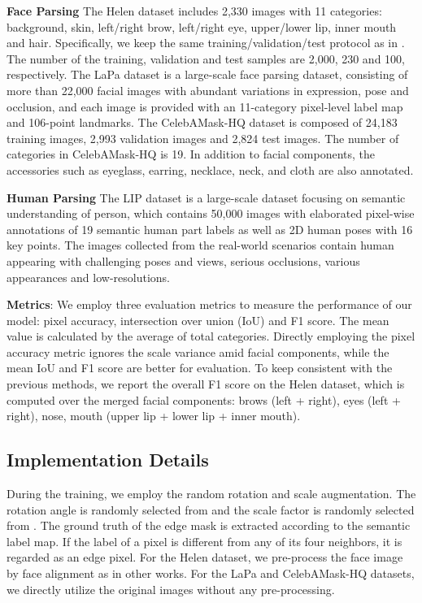 \textbf{Face Parsing} The Helen dataset \cite{le2012interactive} includes 2,330 images with 11 categories: background, skin, left/right brow, left/right eye, upper/lower lip, inner mouth and hair. Specifically, we keep the same training/validation/test protocol as in \cite{le2012interactive}. The number of the training, validation and test samples are 2,000, 230 and 100, respectively. 
The LaPa dataset \cite{liu2020new} is a large-scale face parsing dataset, consisting of more than 22,000 facial images with abundant variations in expression, pose and occlusion, and each image is provided with an 11-category pixel-level label map and 106-point landmarks. 
The CelebAMask-HQ dataset \cite{CelebAMask-HQ} is composed of 24,183 training images, 2,993 validation images and 2,824 test images. The number of categories in CelebAMask-HQ is 19. In addition to facial components, the accessories such as eyeglass, earring, necklace, neck, and cloth are also annotated.

\textbf{Human Parsing} 
The LIP dataset \cite{gong2017look} is a large-scale dataset focusing on semantic understanding of person, which contains 50,000 images with elaborated pixel-wise annotations of 19 semantic human part labels as well as 2D human poses with 16 key points. The images collected from the real-world scenarios contain human appearing with challenging poses and views, serious occlusions, various appearances and low-resolutions.

\textbf{Metrics}: We employ three evaluation metrics to measure the performance of our model: pixel accuracy, intersection over union (IoU) and F1 score. The mean value is calculated by the average of total categories.
Directly employing the pixel accuracy metric ignores the scale variance amid facial components, while the mean IoU and F1 score are better for evaluation. 
To keep consistent with the previous methods, we report the overall F1 score on the Helen dataset, which is computed over the merged facial components: brows (left + right), eyes (left + right), nose, mouth (upper lip + lower lip + inner mouth).

\subsection{Implementation Details}



During the training, we employ the random rotation and scale augmentation. The rotation angle is randomly selected from  and the scale factor is randomly selected from . The ground truth of the edge mask is extracted according to the semantic label map. If the label of a pixel is different from any of its four neighbors, it is regarded as an edge pixel. For the Helen dataset, we pre-process the face image by face alignment as in other works. For the LaPa and CelebAMask-HQ datasets, we directly utilize the original images without any pre-processing.


